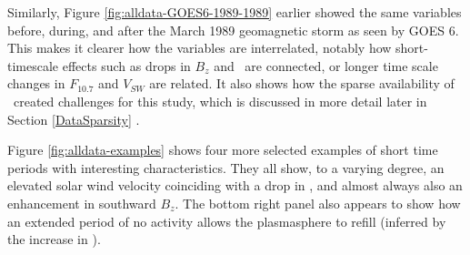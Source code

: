 Similarly, Figure \ref{fig:alldata-GOES6-1989-1989} earlier showed the same variables before, during, and after the March 1989 geomagnetic storm as seen by GOES 6. This makes it clearer how the variables are interrelated, notably how short-timescale effects such as drops in $B_z$ and \dst\ are connected, or longer time scale changes in $F_{10.7}$ and $V_{SW}$ are related. It also shows how the sparse availability of \req\ created challenges for this study, which is discussed in more detail later in Section \ref{DataSparsity} . 

Figure \ref{fig:alldata-examples} shows four more selected examples of short time periods with interesting characteristics. They all show, to a varying degree, an elevated solar wind velocity coinciding with a drop in \dst, and almost always also an enhancement in southward $B_z$. The bottom right panel also appears to show how an extended period of no activity allows the plasmasphere to refill (inferred by the increase in \req).


